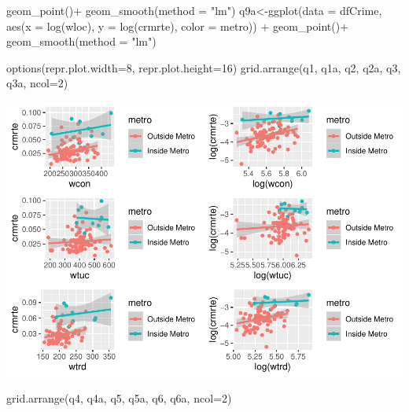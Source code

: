 \documentclass[]{article}
\newenvironment{Shaded}{}{}
\newcommand{\DataTypeTok}[1]{#1}
\newcommand{\DecValTok}[1]{#1}
\newcommand{\KeywordTok}[1]{\textcolor[rgb]{0.00,0.00,1.00}{#1}}
\newcommand{\NormalTok}[1]{#1}
\newcommand{\OperatorTok}[1]{#1}
\newcommand{\StringTok}[1]{\textcolor[rgb]{0.00,0.50,0.50}{#1}}
\begin{document}
\begin{Shaded}
\begin{Highlighting}[]
\StringTok{      }\KeywordTok{geom_point}\NormalTok{()}\OperatorTok{+}
\StringTok{  }\KeywordTok{geom_smooth}\NormalTok{(}\DataTypeTok{method =} \StringTok{"lm"}\NormalTok{)}
\NormalTok{q9a<-}\KeywordTok{ggplot}\NormalTok{(}\DataTypeTok{data =}\NormalTok{ dfCrime, }\KeywordTok{aes}\NormalTok{(}\DataTypeTok{x =} \KeywordTok{log}\NormalTok{(wloc), }\DataTypeTok{y =} \KeywordTok{log}\NormalTok{(crmrte), }\DataTypeTok{color =}\NormalTok{ metro)) }\OperatorTok{+}
\StringTok{      }\KeywordTok{geom_point}\NormalTok{()}\OperatorTok{+}
\StringTok{  }\KeywordTok{geom_smooth}\NormalTok{(}\DataTypeTok{method =} \StringTok{"lm"}\NormalTok{)}

\KeywordTok{options}\NormalTok{(}\DataTypeTok{repr.plot.width=}\DecValTok{8}\NormalTok{, }\DataTypeTok{repr.plot.height=}\DecValTok{16}\NormalTok{)}
\KeywordTok{grid.arrange}\NormalTok{(q1, q1a, q2, q2a, q3, q3a, }\DataTypeTok{ncol=}\DecValTok{2}\NormalTok{)}
\end{Highlighting}
\end{Shaded}

\includegraphics{Bagnard_Gaustad_Hartman_Leung_Lab_3_files/figure-latex/unnamed-chunk-92-1.pdf}

\begin{Shaded}
\begin{Highlighting}[]
\KeywordTok{grid.arrange}\NormalTok{(q4, q4a, q5, q5a, q6, q6a, }\DataTypeTok{ncol=}\DecValTok{2}\NormalTok{)}
\end{Highlighting}
\end{Shaded}
\end{document}
